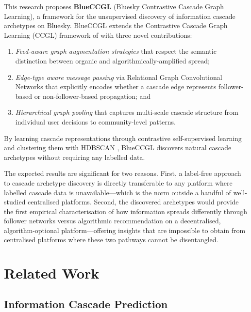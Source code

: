 \documentclass[12pt,a4paper]{article}
\begin{document}
This research proposes \textbf{BlueCCGL} (Bluesky Contrastive Cascade Graph
Learning), a framework for the unsupervised discovery of information cascade
archetypes on Bluesky.  BlueCCGL extends the Contrastive Cascade Graph
Learning (CCGL) framework of \citet{xu2022ccgl} with three novel
contributions:
\begin{enumerate}[label=\textbf{(\arabic*)}]
  \item \emph{Feed-aware graph augmentation strategies} that respect the
        semantic distinction between organic and algorithmically-amplified
        spread;
  \item \emph{Edge-type aware message passing} via Relational Graph
        Convolutional Networks \citep[R-GCN;][]{schlichtkrull2018rgcn} that
        explicitly encodes whether a cascade edge represents follower-based or
        non-follower-based propagation; and
  \item \emph{Hierarchical graph pooling} \citep{ying2018diffpool} that
        captures multi-scale cascade structure from individual user decisions
        to community-level patterns.
\end{enumerate}
By learning cascade representations through contrastive self-supervised
learning and clustering them with HDBSCAN \citep{mcinnes2017hdbscan},
BlueCCGL discovers natural cascade archetypes without requiring any labelled
data.

The expected results are significant for two reasons.  First, a label-free
approach to cascade archetype discovery is directly transferable to any
platform where labelled cascade data is unavailable---which is the norm
outside a handful of well-studied centralised platforms.  Second, the
discovered archetypes would provide the first empirical characterisation of
how information spreads differently through follower networks versus
algorithmic recommendation on a decentralised, algorithm-optional
platform---offering insights that are impossible to obtain from centralised
platforms where these two pathways cannot be disentangled.

\section{Related Work}

\subsection{Information Cascade Prediction}
\end{document}
